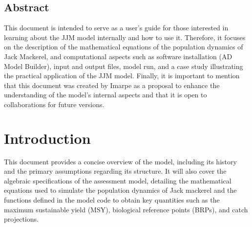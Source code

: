 \documentclass{article}
\begin{document}
\begin{center}
    \section*{Abstract}
\end{center}
This document is intended to serve as a user's guide for those interested in learning about the JJM model internally and how to use it. Therefore, it focuses on the description of the mathematical equations of the population dynamics of Jack Mackerel, and computational aspects such as software installation (AD Model Builder), input and output files, model run, and a case study illustrating the practical application of the JJM model. Finally, it is important to mention that this document was created by Imarpe as a proposal to enhance the understanding of the model's internal aspects and that it is open   to collaborations for future versions.


\newpage
\tableofcontents
\newpage


\section{Introduction}
This document provides a concise overview of the model, including its history and the primary assumptions regarding its structure. It will also cover the algebraic specifications of the assessment model, detailing the mathematical equations used to simulate the population dynamics of Jack mackerel and the functions defined in the model code to obtain key quantities such as the maximum sustainable yield (MSY), biological reference points (BRPs), and catch projections.
\end{document}
